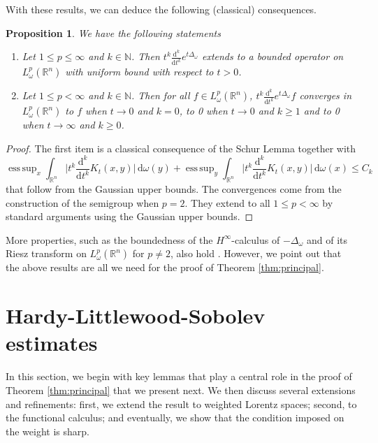 \documentclass[12pt, letterpaper]{amsart}
\newtheorem{prop}[thm]{Proposition}
\theoremstyle{definition}
\theoremstyle{remark}
\numberwithin{equation}{section}
\DeclareMathOperator*{\supess}{ess\,sup}
\begin{document}
With these results, we can deduce the following (classical) consequences.

\begin{prop}\label{prop:boundednessandconvergence}
We have the following statements
\begin{enumerate} 
    \item Let $1\le p\le \infty$ and $k\in \mathbb{N}$.  Then $t^k \frac{\mathrm{d}^k}{\mathrm{d}t^k} e^{t\Delta_\omega}$ extends to a bounded operator on $L^p_\omega(\mathbb{R}^n)$ with uniform bound with respect to $t>0$.
    \item Let $1\le p<\infty$ and $k\in \mathbb{N}$. Then for all $f\in L^p_\omega(\mathbb{R}^n)$, $t^k \frac{\mathrm{d}^k}{\mathrm{d}t^k} e^{t\Delta_\omega}f$ converges in $L^p_\omega(\mathbb{R}^n)$ 
    to $f$   when $t\to 0$ and $k=0$, to 0 when $t\to 0$ and {$k\ge 1$} and to 0 when $t\to \infty$ and {$k\ge 0$}. 
    \end{enumerate}
\end{prop}

\begin{proof}
    The first item is a classical consequence of the Schur Lemma together with 
    \begin{equation*}
        \supess_x \int_{\mathbb{R}^n} \bigg|t^k \frac{\mathrm{d}^k}{\mathrm{d}t^k} K_t(x,y)\bigg| \, \mathrm{d}\omega(y) + \supess_y \int_{\mathbb{R}^n} \bigg|t^k \frac{\mathrm{d}^k}{\mathrm{d}t^k} K_t(x,y)\bigg| \, \mathrm{d}\omega(x) \le C_k
    \end{equation*}
    that follow from the Gaussian upper bounds. 
    The convergences come from the construction of the semigroup when $p=2$. They extend to all $1\le p<\infty$ by standard arguments using the Gaussian upper bounds. 
\end{proof}

More properties, such as the boundedness of the $H^\infty$-calculus of $-\Delta_\omega$ and of its Riesz transform on $L^p_\omega(\mathbb{R}^n)$ for $p \neq 2$, also hold \cite{cruz2017kato}. However, we point out that the above results are all we need for the proof of Theorem \ref{thm:principal}.




\section{Hardy-Littlewood-Sobolev estimates}

In this section, we begin with key lemmas that play a central role in   the proof of Theorem \ref{thm:principal} that we present next. We then discuss several extensions and refinements: first, we extend the result to weighted Lorentz spaces; second, to the functional calculus; and eventually, we show that the condition imposed on the weight is sharp.
\end{document}
